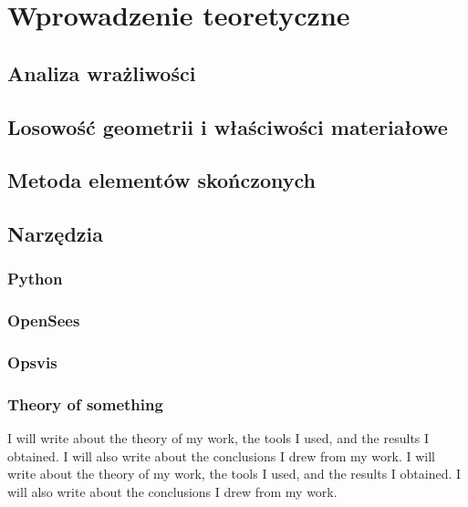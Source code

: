 \newpage
\section{Wprowadzenie teoretyczne}

\subsection{Analiza wrażliwości}

\subsection{Losowość geometrii i właściwości materiałowe}

\subsection{Metoda elementów skończonych}

\subsection{Narzędzia}
\subsubsection{Python}
\subsubsection{OpenSees}
\subsubsection{Opsvis}

\subsubsection{Theory of something}
I will write about the theory of my work, the tools I used, and the results I obtained. I will also write about the conclusions I drew from my work.
I will write about the theory of my work, the tools I used, and the results I obtained. I will also write about the conclusions I drew from my work.
